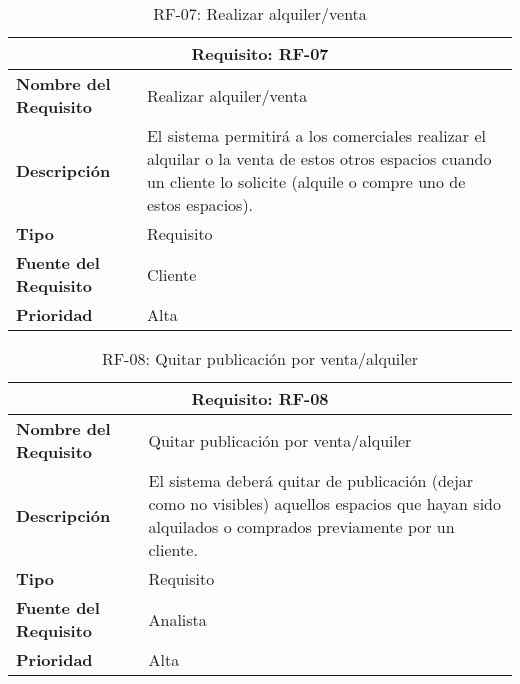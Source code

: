 \begin{table}[H]
\begin{center}
\begin{tabular}{p{} p{7cm}}
\multicolumn{2}{c}{\textbf{Requisito: RF-07} } \\
\hline \hline
\textbf{Nombre del Requisito} & Realizar alquiler/venta  \\
\hline
\textbf{Descripción} & El sistema permitirá a los comerciales realizar el alquilar o la venta de estos otros espacios cuando un cliente lo solicite (alquile o compre uno de estos espacios). \\
\hline
\textbf{Tipo} & Requisito  \\
\hline
\textbf{Fuente del Requisito} &  Cliente \\
\hline
\textbf{Prioridad} & Alta \\ \hline
\end{tabular}
\caption{RF-07: Realizar alquiler/venta}
\label{tab:RF-07}
\end{center}
\end{table}

\begin{table}[H]
\begin{center}
\begin{tabular}{p{} p{7cm}}
\multicolumn{2}{c}{\textbf{Requisito: RF-08} } \\
\hline \hline
\textbf{Nombre del Requisito} & Quitar publicación por venta/alquiler  \\
\hline
\textbf{Descripción} & El sistema deberá quitar de publicación (dejar como no visibles) aquellos espacios que hayan sido alquilados o comprados previamente por un cliente.\\
\hline
\textbf{Tipo} & Requisito  \\
\hline
\textbf{Fuente del Requisito} &  Analista \\
\hline
\textbf{Prioridad} & Alta  \\ \hline
\end{tabular}
\caption{RF-08: Quitar publicación por venta/alquiler}
\label{tab:RF-08}
\end{center}
\end{table}


